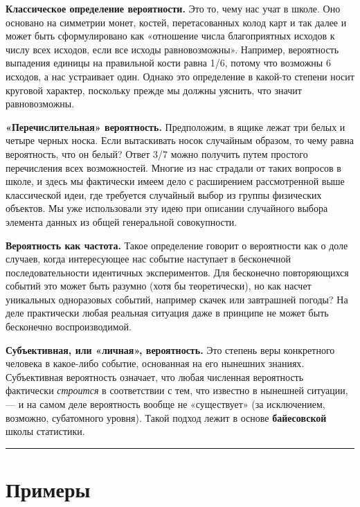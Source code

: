 \documentclass[11pt,a4paper]{article}
\begin{document}
\textbf{Классическое определение вероятности.} Это то, чему нас учат в
школе. Оно основано на симметрии монет, костей, перетасованных колод
карт и так далее и может быть сформулировано как «отношение числа
благоприятных исходов к числу всех исходов, если все исходы
равновозможны». Например, вероятность выпадения единицы на правильной
кости равна 1/6, потому что возможны 6 исходов, а нас устраивает один.
Однако это определение в какой-то степени носит круговой характер,
поскольку прежде мы должны уяснить, что значит равновозможны.

\textbf{«Перечислительная» вероятность.} Предположим, в ящике лежат три
белых и четыре черных носка. Если вытаскивать носок случайным образом,
то чему равна вероятность, что он белый? Ответ 3/7 можно получить путем
простого перечисления всех возможностей. Многие из нас страдали от таких
вопросов в школе, и здесь мы фактически имеем дело с расширением
рассмотренной выше классической идеи, где требуется случайный выбор из
группы физических объектов. Мы уже использовали эту идею при описании
случайного выбора элемента данных из общей генеральной совокупности.

\textbf{Вероятность как частота.} Такое определение говорит о
вероятности как о доле случаев, когда интересующее нас событие наступает
в бесконечной последовательности идентичных экспериментов. Для
бесконечно повторяющихся событий это может быть разумно (хотя бы
теоретически), но как насчет уникальных одноразовых событий, например
скачек или завтрашней погоды? На деле практически любая реальная
ситуация даже в принципе не может быть бесконечно воспроизводимой.

\textbf{Субъективная, или «личная», вероятность.} Это степень веры
конкретного человека в какое-либо событие, основанная на его нынешних
знаниях. Субъективная вероятность означает, что любая численная
вероятность фактически \emph{строится} в соответствии с тем, что
известно в нынешней ситуации, --- и на самом деле вероятность вообще не
«существует» (за исключением, возможно, субатомного уровня). Такой
подход лежит в основе \textbf{байесовской} школы статистики.

    \begin{center}\rule{0.5\linewidth}{0.5pt}\end{center}

    \hypertarget{ux43fux440ux438ux43cux435ux440ux44b}{%
\section{Примеры}\label{ux43fux440ux438ux43cux435ux440ux44b}}
\end{document}
